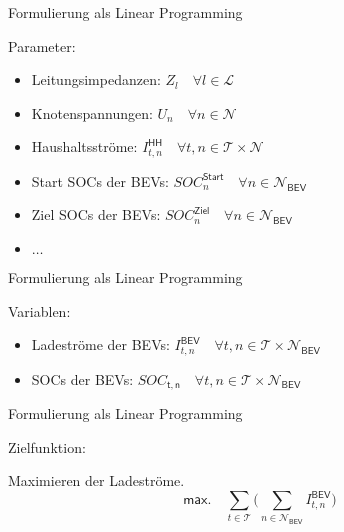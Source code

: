 \documentclass[aspectratio=169]{beamer}
\begin{document}
\begin{frame}{Formulierung als Linear Programming}
	\begin{Large}
		Parameter:
	\end{Large}
	\begin{itemize}
		\item Leitungsimpedanzen: $Z_l\quad\forall l\in\mathcal{L}$
		\item Knotenspannungen: $U_n\quad\forall n\in\mathcal{N}$
		\item Haushaltsströme:
		$I^\mathsf{HH}_{t,n}\quad\forall t,n\in\mathcal{T}\times\mathcal{N}$
		\item Start SOCs der BEVs:
		$SOC^\mathsf{Start}_{n}\quad\forall n\in\mathcal{N}_\mathsf{BEV}$
		\item Ziel SOCs der BEVs:
		$SOC^\mathsf{Ziel}_{n}\quad\forall n\in\mathcal{N}_\mathsf{BEV}$
		\item $\dots$
	\end{itemize}
\end{frame}


\begin{frame}{Formulierung als Linear Programming}
	\begin{Large}
		Variablen:
	\end{Large}
	\begin{itemize}
		\item Ladeströme der BEVs:
		$I^\mathsf{BEV}_{t,n}\quad\forall t,n\in\mathcal{T}\times
		\mathcal{N}_\mathsf{BEV}$
		\item SOCs der BEVs:
		$SOC_\mathsf{t,n}\quad\forall t,n\in\mathcal{T}\times
		\mathcal{N}_\mathsf{BEV}$
	\end{itemize}
\end{frame}


\begin{frame}{Formulierung als Linear Programming}
	\begin{Large}
		Zielfunktion:
	\end{Large}\vspace{.15cm}
	
	Maximieren der Ladeströme.
	\begin{equation*}
		\mathsf{max.}\quad \sum_{t\in\mathcal{T}}\Big(\sum_{n\in
		\mathcal{N}_\mathsf{BEV}}\!\!I^\mathsf{BEV}_{t,n}\Big)
	\end{equation*}
\end{frame}
\end{document}
